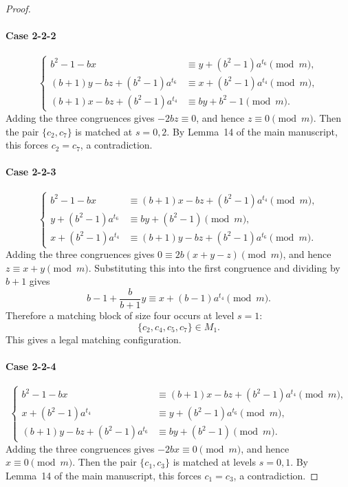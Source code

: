 \documentclass[11pt]{article}
\newcommand{\mymod}{\pmod{m}}
\begin{document}
\begin{proof}
\paragraph{Case 2-2-2}
$$
\begin{cases}
	b^2-1-bx &\equiv y+(b^2-1)a^{t_6}\mymod, \\
	(b+1)y-bz+(b^2-1)a^{t_6} &\equiv x+(b^2-1)a^{t_4}\mymod, \\
	(b+1)x-bz+(b^2-1)a^{t_4} &\equiv by+b^2-1\mymod.
\end{cases}
$$
Adding the three congruences gives $-2bz\equiv0$, and hence $z\equiv0\mymod$. Then the pair $\{c_2,c_7\}$ is matched at $s=0,2$. By Lemma~14 of the main manuscript, this forces $c_2=c_7$, a
contradiction.

\paragraph{Case 2-2-3}
$$
\begin{cases}
	b^2-1-bx &\equiv (b+1)x-bz+(b^2-1)a^{t_4}\mymod, \\
	y+(b^2-1)a^{t_6} &\equiv by+(b^2-1)\mymod, \\
	x+(b^2-1)a^{t_4} &\equiv (b+1)y-bz+(b^2-1)a^{t_6}\mymod.
\end{cases}
$$
Adding the three congruences gives $0\equiv2b(x+y-z)\mymod$, and hence $z\equiv x+y\mymod$. Substituting this into the first congruence and dividing by $b+1$ gives
$$
b-1+\dfrac{b}{b+1}y \equiv x+(b-1)a^{t_4}\mymod.
$$
Therefore a matching block of size four occurs at level $s=1$:
$$
\{c_2,c_4,c_5,c_7\}\in M_1.
$$
This gives a legal matching configuration.

\paragraph{Case 2-2-4}
$$
\begin{cases}
	b^2-1-bx &\equiv (b+1)x-bz+(b^2-1)a^{t_4}\mymod, \\
	 x+(b^2-1)a^{t_4} &\equiv y+(b^2-1)a^{t_6}\mymod,\\
	(b+1)y-bz+(b^2-1)a^{t_6} &\equiv by+(b^2-1)\mymod.
\end{cases}
$$
Adding the three congruences gives $-2bx\equiv0\mymod$, and hence
$x\equiv0\mymod$. Then the pair $\{c_1,c_3\}$ is matched at levels $s=0,1$. By Lemma~14 of the main manuscript, this forces $c_1=c_3$, a
contradiction.


\end{proof}
\end{document}
